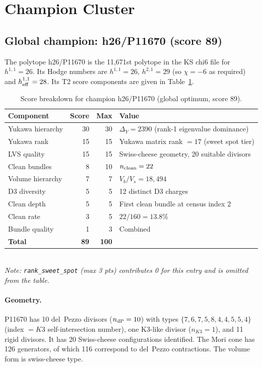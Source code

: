 \documentclass[11pt,a4paper]{article}
\begin{document}
\section{Champion Cluster}
\label{sec:champion}

\subsection{Global champion: h26/P11670 (score 89)}

The polytope h26/P11670 is the 11,671st polytope in the KS chi6
file for $h^{1,1}=26$.
Its Hodge numbers are $h^{1,1}=26$, $h^{2,1}=29$ (so $\chi=-6$
as required) and $h^{1,1}_{\rm eff}=28$.
Its T2 score components are given in Table~\ref{tab:champion}.

\begin{table}[H]
\centering
\caption{Score breakdown for champion h26/P11670 (global optimum,
score 89).}
\label{tab:champion}
\small
\begin{tabular}{lrrl}
\toprule
Component & Score & Max & Value \\
\midrule
Yukawa hierarchy & 30 & 30 & $\Delta_Y = 2390$ (rank-1 eigenvalue dominance) \\
Yukawa rank      & 15 & 15 & Yukawa matrix rank $= 17$ (sweet spot tier) \\
LVS quality      & 15 & 15 & Swiss-cheese geometry, 20 suitable divisors \\
Clean bundles    &  8 & 10 & $n_{\rm clean} = 22$ \\
Volume hierarchy & 7  &  7 & $V_b/V_s = 18{,}494$ \\
D3 diversity     & 5  &  5 & 12 distinct D3 charges \\
Clean depth      & 5  &  5 & First clean bundle at census index 2 \\
Clean rate       & 3  &  5 & $22/160 = 13.8\%$ \\
Bundle quality   & 1  &  3 & Combined \\
\midrule
\textbf{Total} & \textbf{89} & \textbf{100} & \\
\bottomrule
\end{tabular}
\\\small\textit{Note: \texttt{rank\_sweet\_spot} (max 3 pts) contributes 0 for this entry and is omitted from the table.}
\end{table}

\paragraph{Geometry.}
P11670 has 10 del~Pezzo divisors ($n_{\rm dP}=10$) with types
$\{7,6,7,5,8,4,4,5,5,4\}$ (index $= K3$ self-intersection number),
one K3-like divisor ($n_{K3}=1$), and 11 rigid divisors.
It has 20 Swiss-cheese configurations identified.
The Mori cone has 126 generators, of which 116 correspond to
del~Pezzo contractions.
The volume form is swiss-cheese type.
\end{document}
